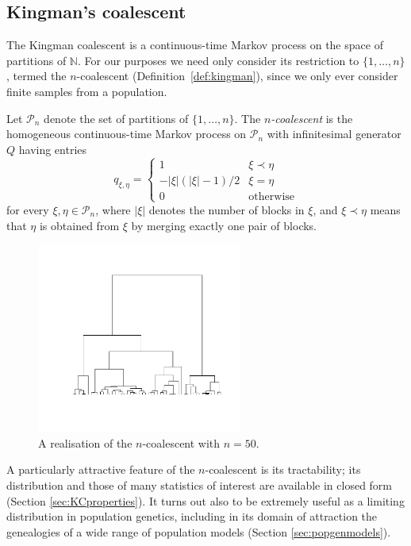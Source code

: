 \subsection{Kingman's coalescent}
The Kingman coalescent \parencite{kingman1982gene, kingman1982coal, kingman1982exch} is a continuous-time Markov process on the space of partitions of $\mathbb{N}$. For our purposes we need only consider its restriction to $\{1,\dots,n\}$, termed the $n$-coalescent (Definition~\ref{def:kingman}), since we only ever consider finite samples from a population. 
\begin{defn}%
\label{def:kingman}
Let $\mathcal{P}_n$ denote the set of partitions of $\{1,\dots,n\}$.
The \emph{$n$-coalescent} is the homogeneous continuous-time Markov process on $\mathcal{P}_n$ with infinitesimal generator $Q$ having entries
\begin{equation}\label{eq:KCgenerator}
q_{\xi,\eta} = \begin{cases}
1 & \xi \prec \eta\\
-|\xi|(|\xi|-1)/2 & \xi=\eta \\
0 & \text{otherwise}
\end{cases}
\end{equation}
for every $\xi, \eta \in \mathcal{P}_n$, where $|\xi|$ denotes the number of blocks in $\xi$, and $\xi \prec \eta$ means that $\eta$ is obtained from $\xi$ by merging exactly one pair of blocks.
\end{defn}
\begin{figure}
\centering
\includegraphics[width=0.6\textwidth, trim={2.8cm 3cm 1.5cm 2cm}, clip]{plots/ncoalescent.pdf}
\caption[The $n$-coalescent]{A realisation of the $n$-coalescent with $n=50$.}
\end{figure}
A particularly attractive feature of the $n$-coalescent is its tractability; its distribution and those of many statistics of interest are available in closed form (Section \ref{sec:KCproperties}).
It turns out also to be extremely useful as a limiting distribution in population genetics, including in its domain of attraction the genealogies of a wide range of population models (Section \ref{sec:popgenmodels}).


